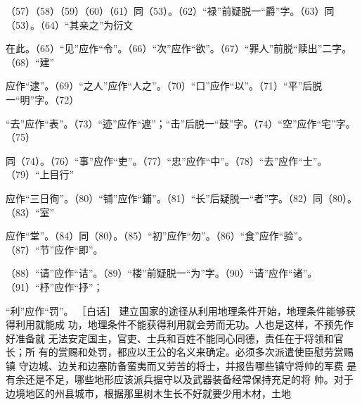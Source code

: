 \documentclass[12pt,UTF8]{ctexbook}
\begin{document}
（57）（58）（59）（60）（61）同（53）。（62）“禄”前疑脱一“爵”字。（63）同（53）。（64）“其亲之”为衍文 

在此。（65）“见”应作“令”。（66）“次”应作“欲”。（67）“罪人”前脱“赎出”二字。（68）“建” 

应作“逮”。（69）“之人”应作“人之”。（70）“口”应作“以”。（71）“平”后脱一“明”字。（72） 

“去”应作“表”。（73）“迹”应作“遮”；“击”后脱一“鼓”字。（74）“空”应作“宅”字。（75） 

同（74）。（76）“事”应作“吏”。（77）“忠”应作“中”。（78）“去”应作“士”。（79）“上目行” 

应作“三日徇”。（80）“铺”应作“鋪”。（81）“长”后疑脱一“者”字。（82）同（80）。（83）“室” 

应作“堂”。（84）同（80）。（85）“初”应作“勿”。（86）“食”应作“验”。（87）“节”应作“即”。 

（88）“请”应作“诘”。（89）“楼”前疑脱一“为”字。（90）“请”应作“诸”。（91）“杼”应作“抒”； 

“利”应作“罚”。 
［白话］ 
建立国家的途径从利用地理条件开始，地理条件能够获得利用就能成 
功，地理条件不能获得利用就会劳而无功。人也是这样，不预先作好准备就 
无法安定国主，官吏、士兵和百姓不能同心同德，责任在于将领和官长；所 
有的赏赐和处罚，都应以王公的名义来确定。必须多次派遣使臣慰劳赏赐镇 
守边城、边关和边塞防备蛮夷而又劳苦的将士，并报告哪些镇守将帅的军费 
是有余还是不足，哪些地形应该派兵据守以及武器装备经常保持充足的将 
帅。对于边境地区的州县城市，根据那里树木生长不好就要少用木材，土地 
\end{document}
